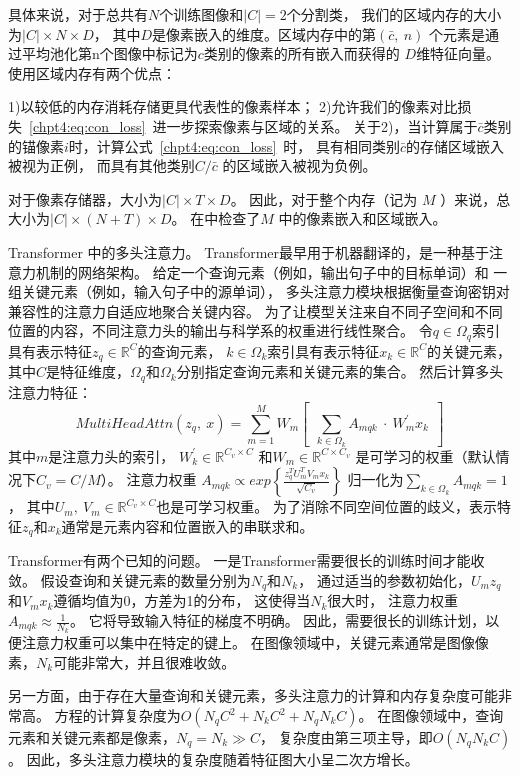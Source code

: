 具体来说，对于总共有$N$个训练图像和$|C|=2$个分割类，
我们的区域内存的大小为$|C|\times N \times D$，
其中$D$是像素嵌入的维度。区域内存中的第$(\bar{c},~n)$
个元素是通过平均池化第n个图像中标记为$c$类别的像素的所有嵌入而获得的
$D$维特征向量。
使用区域内存有两个优点：

1)以较低的内存消耗存储更具代表性的像素样本；
2)允许我们的像素对比损失~\ref{chpt4:eq:con_loss}~进一步探索像素与区域的关系。
关于2)，当计算属于$\bar{c}$类别的锚像素$i$时，计算公式~\ref{chpt4:eq:con_loss}~时，
具有相同类别$\bar{c}$的存储区域嵌入被视为正例，
而具有其他类别$C/ \bar{c}$ 的区域嵌入被视为负例。
% 
% 
% 
% 
\par
对于像素存储器，大小为$|C|\times T \times D$。
因此，对于整个内存（记为 $M$ ）来说，总大小为$|C| \times (N+T) \times D$。
在\todo 中检查了$M$ 中的像素嵌入和区域嵌入。




\todo 


Transformer 中的多头注意力。
Transformer最早用于机器翻译的，是一种基于注意力机制的网络架构。
给定一个查询元素（例如，输出句子中的目标单词）和
一组关键元素（例如，输入句子中的源单词），
多头注意力模块根据衡量查询密钥对兼容性的注意力自适应地聚合关键内容。
为了让模型关注来自不同子空间和不同位置的内容，不同注意力头的输出与科学系的权重进行线性聚合。
令$q\in \Omega_{q}$索引具有表示特征$z_{q} \in \mathbb{R}^{C}$的查询元素，
$k\in \Omega_{k}$索引具有表示特征$x_{k} \in \mathbb{R}^{C}$的关键元素，
其中$C$是特征维度，$\Omega_{q}$和$\Omega_{k}$分别指定查询元素和关键元素的集合。
然后计算多头注意力特征：
% 
% 
% 
% 
\begin{equation}
MultiHeadAttn(z_{q},~x)=\sum_{m=1}^{M}
W_{m}\left [ ~~\sum_{k\in \Omega_{k}}^{}A_{mqk} ~\cdot~ W_{m}^{'} x_{k}  ~~\right ]  
\end{equation}
% 
% 
% 
% 
其中$m$是注意力头的索引，
$ W_{k}^{{}' } \in \mathbb{R}^{C_{v} \times C} $
和$W_{m} \in \mathbb{R}^{C\times C_{v} }$
是可学习的权重（默认情况下$C_{v}=C/M$）。
注意力权重 
$A_{mqk} \propto exp \left \{ 
	\frac{
	z_{q}^{T} U_{m}^{T} V_{m} x_{k}
	}{ \sqrt{C_{v}}
	}  \right \} $
% 
% 
% 
归一化为$ {\textstyle \sum_{k\in\Omega_{k}}^{}} A_{mqk} = 1$，
其中$U_{m},~V_{m} \in \mathbb{R}^{C_{v}\times C}$也是可学习权重。
为了消除不同空间位置的歧义，表示特征$z_{q}$和$x_{k}$通常是元素内容和位置嵌入的串联求和。

Transformer有两个已知的问题。
一是Transformer需要很长的训练时间才能收敛。
假设查询和关键元素的数量分别为$N_{q}$和$N_{k}$，
通过适当的参数初始化，$U_{m}z_{q}$和$ V_{m}x_{k}$遵循均值为0，方差为1的分布，
这使得当$N_{k}$很大时，
注意力权重$A_{mqk} \approx \frac{1}{N_{k}} $。
它将导致输入特征的梯度不明确。
因此，需要很长的训练计划，以便注意力权重可以集中在特定的键上。
在图像领域中，关键元素通常是图像像素，$N_{k}$可能非常大，并且很难收敛。
% 
% 
% 
% 
\par
%
% 
% 
% 
另一方面，由于存在大量查询和关键元素，多头注意力的计算和内存复杂度可能非常高。
方程的计算复杂度为$O\left ( N_{q}C^{2} + N_{k}C^{2}+N_{q}N_{k}C \right ) $。
在图像领域中，查询元素和关键元素都是像素，$N_{q}=N_{k} \gg C$，
复杂度由第三项主导，即$O(N_{q}N_{k}C) $。
因此，多头注意力模块的复杂度随着特征图大小呈二次方增长。


